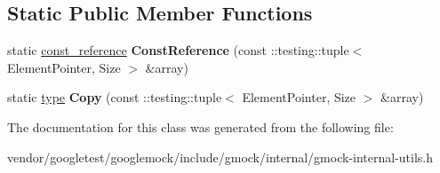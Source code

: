 \subsection*{Static Public Member Functions}
\begin{DoxyCompactItemize}
\item 
\mbox{\label{classtesting_1_1internal_1_1_stl_container_view_3_01_1_1testing_1_1tuple_3_01_element_pointer_00_01_size_01_4_01_4_aba9be6fade312dd735ac47a3cb8cc355}} 
static \mbox{\hyperlink{classtesting_1_1internal_1_1_native_array}{const\+\_\+reference}} {\bfseries Const\+Reference} (const \+::testing\+::tuple$<$ Element\+Pointer, Size $>$ \&array)
\item 
\mbox{\label{classtesting_1_1internal_1_1_stl_container_view_3_01_1_1testing_1_1tuple_3_01_element_pointer_00_01_size_01_4_01_4_a3d42db21a2f88d407a4b5acbb7fe252c}} 
static \mbox{\hyperlink{classtesting_1_1internal_1_1_native_array}{type}} {\bfseries Copy} (const \+::testing\+::tuple$<$ Element\+Pointer, Size $>$ \&array)
\end{DoxyCompactItemize}


The documentation for this class was generated from the following file\+:\begin{DoxyCompactItemize}
\item 
vendor/googletest/googlemock/include/gmock/internal/gmock-\/internal-\/utils.\+h\end{DoxyCompactItemize}
